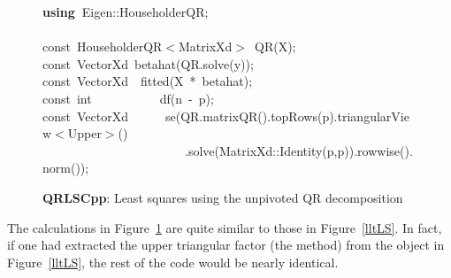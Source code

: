 \documentclass[shortnames,article]{jss}
\newcommand{\hlstd}[1]{\textcolor[rgb]{0,0,0}{#1}}
\newcommand{\hlopt}[1]{\textcolor[rgb]{0,0,0}{#1}}
\newcommand{\hlkwa}[1]{\textcolor[rgb]{0.61,0.13,0.93}{\bf{#1}}}
\newcommand{\hlkwb}[1]{\textcolor[rgb]{0.13,0.54,0.13}{#1}}
\newcommand{\hlkwd}[1]{\textcolor[rgb]{0,0,0}{#1}}
\begin{document}
\begin{figure}[htb]
    \noindent
    \ttfamily
    \hlstd{}\hlkwa{using\ }\hlstd{Eigen}\hlopt{::}\hlstd{HouseholderQR}\hlopt{;}\hspace*{\fill}\\
    \hlstd{}\hspace*{\fill}\\
    \hlkwb{const\ }\hlstd{HouseholderQR}\hlopt{$<$}\hlstd{MatrixXd}\hlopt{$>$\ }\hlstd{}\hlkwd{QR}\hlstd{}\hlopt{(}\hlstd{X}\hlopt{);}\hspace*{\fill}\\
    \hlstd{}\hlkwb{const\ }\hlstd{VectorXd\ }\hlkwd{betahat}\hlstd{}\hlopt{(}\hlstd{QR}\hlopt{.}\hlstd{}\hlkwd{solve}\hlstd{}\hlopt{(}\hlstd{y}\hlopt{));}\hspace*{\fill}\\
    \hlstd{}\hlkwb{const\ }\hlstd{VectorXd}\hlstd{\ \ }\hlstd{}\hlkwd{fitted}\hlstd{}\hlopt{(}\hlstd{X\ }\hlopt{{*}\ }\hlstd{betahat}\hlopt{);}\hspace*{\fill}\\
    \hlstd{}\hlkwb{const\ int}\hlstd{\ \ \ \ \ \ \ \ \ \ \ }\hlkwb{}\hlstd{}\hlkwd{df}\hlstd{}\hlopt{(}\hlstd{n\ }\hlopt{{-}\ }\hlstd{p}\hlopt{);}\hspace*{\fill}\\
    \hlstd{}\hlkwb{const\ }\hlstd{VectorXd}\hlstd{\ \ \ \ \ \ }\hlstd{}\hlkwd{se}\hlstd{}\hlopt{(}\hlstd{QR}\hlopt{.}\hlstd{}\hlkwd{matrixQR}\hlstd{}\hlopt{().}\hlstd{}\hlkwd{topRows}\hlstd{}\hlopt{(}\hlstd{p}\hlopt{).}\hlstd{triangularView}\hlopt{$<$}\hlstd{Upper}\hlopt{$>$()}\hspace*{\fill}\\
    \hlstd{}\hlstd{\ \ \ \ \ \ \ \ \ \ \ \ \ \ \ \ \ \ \ \ \ \ \ }\hlstd{}\hlopt{.}\hlstd{}\hlkwd{solve}\hlstd{}\hlopt{(}\hlstd{MatrixXd}\hlopt{::}\hlstd{}\hlkwd{Identity}\hlstd{}\hlopt{(}\hlstd{p}\hlopt{,}\hlstd{p}\hlopt{)).}\hlstd{}\hlkwd{rowwise}\hlstd{}\hlopt{().}\hlstd{}\hlkwd{norm}\hlstd{}\hlopt{());}\hlstd{}\hspace*{\fill}\\
    \mbox{}
    \normalfont
    \normalsize
    \caption{\textbf{QRLSCpp}: Least squares using the unpivoted QR decomposition}
    \label{QRLS}
\end{figure}
The calculations in Figure~\ref{QRLS} are quite similar to those in
Figure~\ref{lltLS}.  In fact, if one had extracted the upper
triangular factor (the  method) from the 
object in Figure~\ref{lltLS}, the rest of the code would be nearly
identical.
\end{document}
